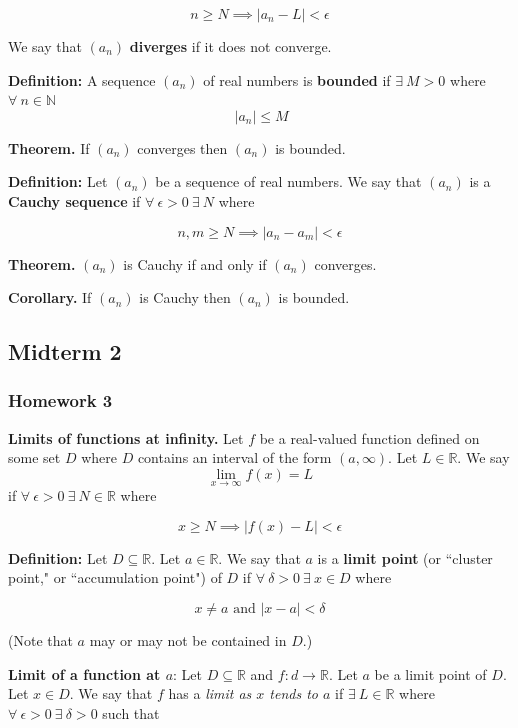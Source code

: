 \documentclass{article}
\begin{document}
\[
n \geq N \implies |a_n - L| < \epsilon
\]

We say that \((a_n)\) \textbf{diverges} if it does not converge.

\textbf{Definition:} A sequence \((a_n)\) of real numbers is \textbf{bounded} if \(\exists \ M > 0\) where \(\forall \ n \in \mathbb{N}\) \[\ |a_n| \leq M \]

\textbf{Theorem.} If \((a_n)\) converges then \((a_n)\) is bounded.

\textbf{Definition:} Let \((a_n)\) be a sequence of real numbers. We say that \((a_n)\) is a \textbf{Cauchy sequence} if \(\forall \ \epsilon > 0 \ \exists \ N\) where

\[
n, m \geq N \implies |a_n - a_m| < \epsilon
\]

\textbf{Theorem.} \((a_n)\) is Cauchy if and only if \((a_n)\) converges.

\textbf{Corollary.} If \((a_n)\) is Cauchy then \((a_n)\) is bounded.

\pagebreak

\subsection{Midterm 2}

\subsubsection{Homework 3}

\textbf{Limits of functions at infinity.} Let \(f\) be a real-valued function defined on some set \(D\) where \(D\) contains an interval of the form \((a, \infty)\). Let \(L \in \mathbb{R}\). We say \[\lim_{x \to \infty} f(x) = L\]if \(\forall \ \epsilon >0 \ \exists \ N \in \mathbb{R}\) where

\[
x \geq N \implies |f(x) - L| < \epsilon
\]

\textbf{Definition:} Let \(D \subseteq \mathbb{R}\). Let \(a \in \mathbb{R}\). We say that \(a\) is a \textbf{limit point} (or ``cluster point," or ``accumulation point") of \(D\) if \(\forall \ \delta > 0 \ \exists \ x \in D\) where

\[
x \neq a \text{ and } |x - a| < \delta
\]

(Note that \(a\) may or may not be contained in \(D\).)

\textbf{Limit of a function at \(a\)}: Let \(D \subseteq \mathbb{R}\) and \(f:d \to \mathbb{R}\). Let \(a\) be a limit point of \(D\). Let \(x \in D\). We say that \(f\) has a \textit{limit as \(x\) tends to \(a\)} if \(\exists \ L \in \mathbb{R}\) where \(\forall \ \epsilon > 0 \ \exists \ \delta > 0 \) such that
\end{document}
